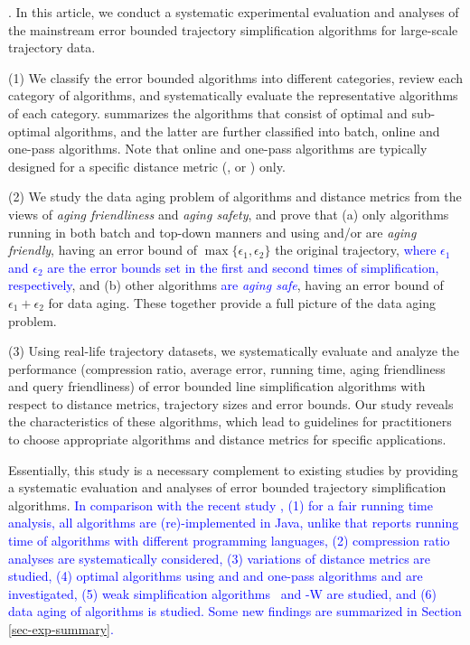 {.
In this article, we conduct a systematic experimental evaluation and analyses of the mainstream error bounded trajectory simplification algorithms for large-scale trajectory data.

\stab (1) We classify the error bounded \lsa algorithms into different categories, review each category of algorithms, and systematically evaluate the representative algorithms of each category.
%
 summarizes the algorithms that consist of optimal and sub-optimal algorithms, and the latter are further classified into batch, online and one-pass algorithms.
Note that online and one-pass algorithms are typically designed for a specific distance metric  (\ped, \sed or \dad) only.

\stab (2) {We study the data aging problem of \lsa algorithms and distance metrics from the views of \emph{aging friendliness} and \emph{aging safety}, and prove that (a) only algorithms running in both batch and top-down manners and using \ped and/or \sed are \emph{aging friendly}, having an error bound of $\max{\{\epsilon_1, \epsilon_2\}}$ \wrt the original trajectory, \textcolor{blue}{where $\epsilon_1$ and $\epsilon_2$ are the error bounds set in the first and second times of simplification, respectively}, and (b) other algorithms \textcolor{blue}{are \emph{aging safe}}, having an error bound of ${\epsilon_1+\epsilon_2}$ for data aging.  These together provide a full picture of the data aging problem.}

\stab (3) Using real-life trajectory datasets, we systematically evaluate and analyze the performance (compression ratio, average error, running time, {aging friendliness and query friendliness}) of error bounded line simplification algorithms with respect to {distance metrics,} trajectory sizes and error bounds.
Our study reveals the characteristics of these algorithms, which lead to guidelines for practitioners to choose appropriate algorithms and distance metrics for specific applications.


Essentially, this study is a necessary complement to existing studies by providing a systematic evaluation and analyses of error bounded trajectory simplification algorithms. 
\textcolor{blue}{In comparison with the recent study \cite{Zhang:Evaluation},
(1) for a fair running time analysis, all algorithms are (re)-implemented in Java, unlike \cite{Zhang:Evaluation} that reports running time of algorithms with different programming languages,
(2) compression ratio analyses are systematically considered,
(3) variations of distance metrics are studied, 
(4) optimal algorithms using \ped and \sed and one-pass algorithms \siped and \cised are investigated, 
(5) weak simplification algorithms \operba~and \cised-W are studied, and
(6) data aging of \lsa algorithms is studied.
Some new findings are summarized in Section \ref{sec-exp-summary}.}


}

